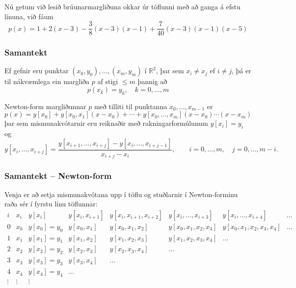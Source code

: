 \documentclass[icelandic,a4paper,12pt]{article}
\newcommand{\R}{{\mathbb  R}}
\begin{document}
Nú getum við lesið brúunarmargliðuna okkar úr töflunni með að ganga á
efstu línuna, við fáum 
\begin{equation*}
  p(x) = 1 + 2(x-3) - \frac 38 (x-3)(x-1)
  + \frac 7{40} (x-3)(x-1)(x-5)
\end{equation*}


\subsubsection{Samantekt} 
Ef gefnir eru punktar $(x_0,y_0), \ldots, (x_m,y_m)$ í $\R^2$,
þar sem $x_i\neq x_j$ ef $i\neq j$, þá er til nákvæmlega ein 
margliða $p$ af stigi $\leq m$ þannig að
$$
  p(x_k) = y_k, \quad k = 0, \ldots, m
$$

\pause
Newton-form margliðunnar $p$ með tilliti til punktanna
$x_0,\dots,x_{m-1}$ er
$$
p(x)=y[x_0]+y[x_0,x_1](x-x_0)+\cdots+y[x_0,\dots,x_m](x-x_0)\cdots(x-x_m)
$$
þar sem mismunakvótarnir eru reiknaðir með rakningarformúlunum
$y[x_i]=y_i$ og
$$
  y[x_i,\ldots,x_{i+j}]
  = \frac{y[x_{i+1},\ldots,x_{i+j}] - y[x_i,\ldots,x_{i+j-1}]}
  {x_{i+j} - x_i}, \qquad i=0,\dots,m, \quad j=0,\dots,m-i.
$$


\subsubsection{Samantekt -- Newton-form} 

Venja er að setja mismunakvótana upp í töflu og stuðlarnir
í Newton-forminu raða sér í fyrstu línu töflunnar:
{\footnotesize
\begin{equation*}
  \begin{array}{c|c|cccccc}
    i & x_i & y[x_i] & y[x_i,x_{i+1}] & y[x_i,x_{i+1},x_{i+2}]
    & y[x_i,\dots,x_{i+3}] &y[x_i,\dots,x_{i+4}] &\dots  \\
    \hline
    0 & x_0 & y[x_0] = y_0 & y[x_0,x_1] & y[x_0,x_1,x_2]
    & y[x_0,x_1,x_2,x_3]&y[x_0,x_1,x_2,x_3,x_4]& \dots \\
    1 & x_1 & y[x_1] = y_1 & y[x_1,x_2] & y[x_1,x_2,x_3] &
    y[x_1,x_2,x_3,x_4]&\dots \\
    2 & x_2 & y[x_2] = y_2 & y[x_2,x_3] &y[x_2,x_3,x_4]&\dots & \\
    3 & x_3 & y[x_3] = y_3 & y[x_3,x_4] &\dots & & \\
    4 & x_4 & y[x_4] = y_4 & \dots &  \\
\vdots & \vdots &\vdots
  \end{array}
\end{equation*}
}
\end{document}
